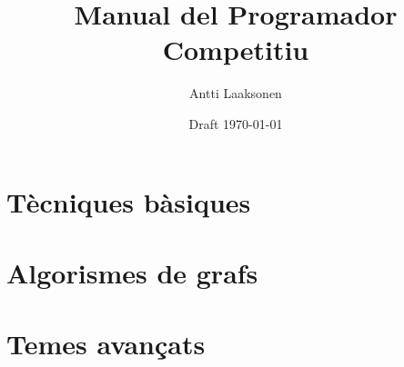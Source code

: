 \documentclass[twoside,12pt,a4paper,catalan]{book}
\date{Draft \today}
\title{\Huge Manual del Programador Competitiu}
\author{\Large Antti Laaksonen}
\begin{document}


\frontmatter
\maketitle
\setcounter{tocdepth}{1}
\tableofcontents



\mainmatter
{}
\setcounter{page}{1}

\newcommand{\key}[1] {\textbf{#1}}

\part{Tècniques bàsiques}










\part{Algorismes de grafs}






%
%
%
%
\part{Temes avançats}
%
%
%
%
%
%
%
%
%
%

\cleardoublepage
{}
{}


\cleardoublepage
\printindex
\end{document}
